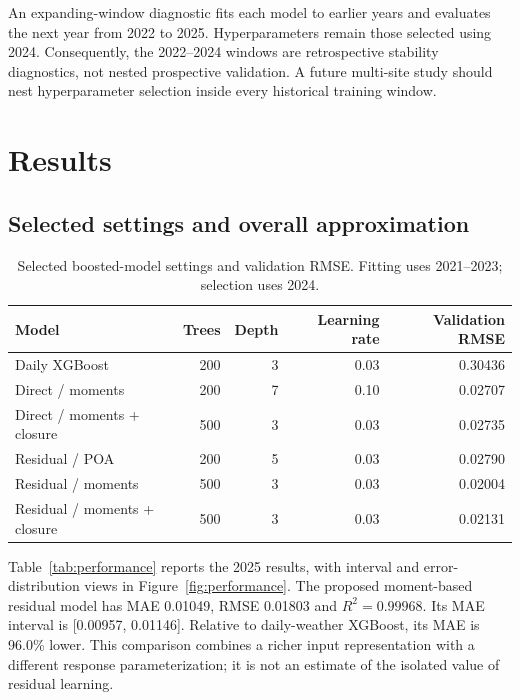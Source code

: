 \documentclass[11pt,a4paper]{article}
\begin{document}
An expanding-window diagnostic fits each model to earlier years and evaluates the next year from 2022 to 2025. Hyperparameters remain those selected using 2024. Consequently, the 2022--2024 windows are retrospective stability diagnostics, not nested prospective validation. A future multi-site study should nest hyperparameter selection inside every historical training window.

\section{Results}
\subsection{Selected settings and overall approximation}
\begin{table}[htbp]\centering\small
\caption{Selected boosted-model settings and validation RMSE. Fitting uses 2021--2023; selection uses 2024.}\label{tab:tuning}
\begin{tabular}{@{}lrrrr@{}}\toprule
Model & Trees & Depth & Learning rate & Validation RMSE\\\midrule
Daily XGBoost & 200 & 3 & 0.03 & 0.30436 \\
Direct / moments & 200 & 7 & 0.10 & 0.02707 \\
Direct / moments + closure & 500 & 3 & 0.03 & 0.02735 \\
Residual / POA & 200 & 5 & 0.03 & 0.02790 \\
Residual / moments & 500 & 3 & 0.03 & 0.02004 \\
Residual / moments + closure & 500 & 3 & 0.03 & 0.02131 \\
\bottomrule\end{tabular}\end{table}

Table~\ref{tab:performance} reports the 2025 results, with interval and error-distribution views in Figure~\ref{fig:performance}. The proposed moment-based residual model has MAE 0.01049, RMSE 0.01803 and $R^2=0.99968$. Its MAE interval is [0.00957, 0.01146]. Relative to daily-weather XGBoost, its MAE is 96.0\% lower. This comparison combines a richer input representation with a different response parameterization; it is not an estimate of the isolated value of residual learning.
\end{document}
